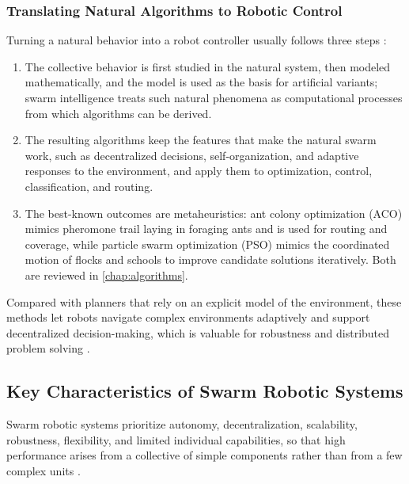 \subsubsection{Translating Natural Algorithms to Robotic Control}

Turning a natural behavior into a robot controller usually follows three steps
\cite{bonabeau1999swarm,seebacher2025collective,chen2025survey}:
\begin{enumerate}
  \item {} The collective behavior is first studied in
        the natural system, then modeled mathematically, and the model is used
        as the basis for artificial variants; swarm intelligence treats such
        natural phenomena as computational processes from which algorithms can
        be derived.
  \item {} The resulting algorithms keep the
        features that make the natural swarm work, such as decentralized
        decisions, self-organization, and adaptive responses to the environment,
        and apply them to optimization, control, classification, and routing.
  \item {} The best-known outcomes are metaheuristics:
        ant colony optimization (ACO) mimics pheromone trail laying in foraging
        ants and is used for routing and coverage, while particle swarm
        optimization (PSO) mimics the coordinated motion of flocks and schools to
        improve candidate solutions iteratively. Both are reviewed in
        \cref{chap:algorithms}.
\end{enumerate}
Compared with planners that rely on an explicit model of the environment, these
methods let robots navigate complex environments adaptively and support
decentralized decision-making, which is valuable for robustness and distributed
problem solving \cite{chen2025survey}.

\subsection{Key Characteristics of Swarm Robotic Systems}

Swarm robotic systems prioritize autonomy, decentralization, scalability,
robustness, flexibility, and limited individual capabilities, so that high
performance arises from a collective of simple components rather than from a few
complex units \cite{dias2021swarm,brambilla2013swarm}.

